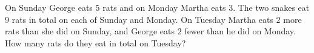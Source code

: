 On Sunday George eats $5$ rats and on Monday Martha eats $3$. The two snakes eat $9$ rats in total on each of Sunday and Monday. On Tuesday Martha eats $2$ more rats than she did on Sunday, and George eats $2$ fewer than he did on Monday. How many rats do they eat in total on Tuesday?
